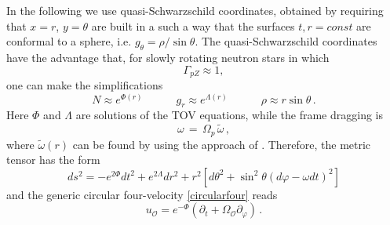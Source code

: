 \documentclass[usenatbib%
]{mnras}
\newcommand{\spc}{\quad \quad \quad}
\begin{document}
In the following we use  quasi-Schwarzschild  coordinates, obtained by requiring that $x=r$, $y=\theta$ are built in a such a way that the surfaces $t,r=const$ are conformal to a sphere, i.e. $g_\theta = \rho/\sin \theta$. 
The  quasi-Schwarzschild  coordinates have the advantage that, for slowly rotating neutron stars in which
\begin{equation}\label{gonzooooo}
\Gamma_{pZ} \approx 1 ,
\end{equation} 
one can make the simplifications
\begin{equation}\label{gonzissimooooo}
N\approx e^{\Phi(r)}   \spc    g_r \approx e^{\Lambda(r)}  \spc \rho \approx  r \sin \theta  \, .
\end{equation}
Here $\Phi$ and $\Lambda$ are solutions of the TOV equations, while the frame dragging is
\begin{equation}
\omega\,  = \,  \Omega_p \, \tilde{\omega}  \,  ,
\end{equation} 
where $\tilde{\omega}(r)$ can be found by using the approach of \cite{Hartle_slowly1}.
Therefore, the metric tensor has the form
\begin{equation}
ds^2 = -e^{2\Phi}dt^2 + e^{2\Lambda}dr^2 + r^2[d\theta^2 +  \sin^2 \theta(d\varphi - \omega dt)^2] 
\end{equation}
and the  generic circular four-velocity \eqref{circularfour} reads
\begin{equation}
u_\mathcal{O} = e^{-\Phi}(\partial_t + \Omega_\mathcal{O}\partial_\varphi)\, .
\end{equation}
%
\end{document}
